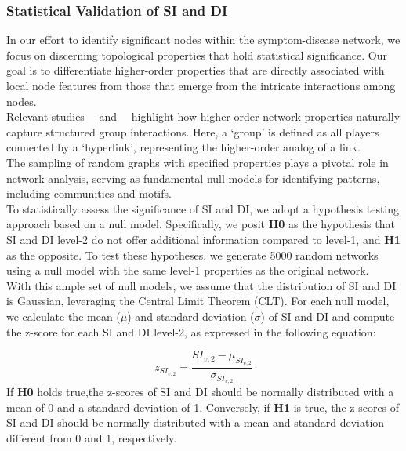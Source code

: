 \subsubsection*{Statistical Validation of SI and DI}

In our effort to identify significant nodes within the symptom-disease network,
we focus on discerning topological properties that hold statistical significance.
Our goal is to differentiate higher-order properties that are directly associated with local node features from those
that emerge from the intricate interactions among nodes.\\
Relevant studies~\citeauthor{Squartini_2011_a}~\cite{Squartini_2011_a, Squartini_2011_b} and~\citeauthor{Spelta_2023}~\cite{Spelta_2023}
highlight how higher-order network properties naturally capture structured group interactions.
Here, a `group' is defined as all players connected by a `hyperlink', representing the higher-order analog of a link.\\
The sampling of random graphs with specified properties plays a pivotal role in network analysis,
serving as fundamental null models for identifying patterns, including communities and motifs.\\
To statistically assess the significance of SI and DI, we adopt a hypothesis testing approach based on a null model.
Specifically, we posit \textbf{H0} as the hypothesis that SI and DI level-2 do not offer additional information compared to level-1,
and \textbf{H1} as the opposite.
To test these hypotheses, we generate 5000 random networks using a null model with the same level-1 properties as the original network.\\
With this ample set of null models, we assume that the distribution of SI and DI is Gaussian, leveraging the Central Limit Theorem (CLT).
For each null model, we calculate the mean ($\mu$) and standard deviation ($\sigma$) of SI and DI and compute the z-score for each SI and DI level-2,
as expressed in the following equation:

\begin{equation}
    z_{SI_{v, 2}} = \frac{SI_{v, 2} - \mu_{SI_{v, 2}}}{\sigma_{SI_{v, 2}}}
\end{equation}
\noindent
If \textbf{H0} holds true,the z-scores of SI and DI should be normally distributed with a mean of 0 and a standard deviation of 1.
Conversely, if \textbf{H1} is true, the z-scores of SI and DI should be normally distributed with a mean and standard deviation different from 0 and 1,
respectively.


